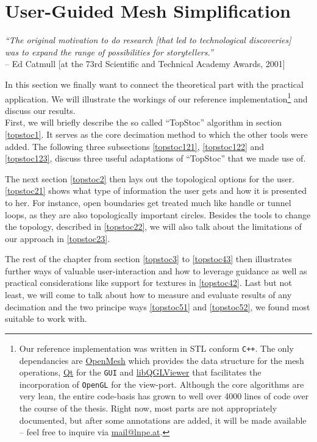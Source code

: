 \chapter{User-Guided Mesh Simplification}
\label{topstoc0}

\begin{flushright}
\textit{``The original motivation to do research [that led to technological discoveries]\\was to expand the range of possibilities for storytellers.''}\\
-- Ed Catmull {[}at the 73rd Scientific and Technical Academy Awards, 2001{]}
\end{flushright}

In this section we finally want to connect the theoretical part with the practical application.
We will illustrate the workings of our reference implementation\footnote{ Our reference implementation was written in STL conform \texttt{C++}. The only dependancies are \href{http://www.openmesh.org/}{OpenMesh} which provides the data structure for the mesh operations, \href{http://www.qtcentre.org/content/}{Qt} for the \texttt{GUI} and \href{http://www.libqglviewer.com/}{libQGLViewer} that facilitates the incorporation of \texttt{OpenGL} for the view-port. Although the core algorithms are very lean, the entire code-basis has grown to well over 4000 lines of code over the course of the thesis.
Right now, most parts are not appropriately documented, but after some annotations are added, it will be made available -- feel free to inquire via \href{mailto:mail@lnpe.at}{mail@lnpe.at}.} and discuss our results.\\
First, we will briefly describe the so called ``TopStoc'' algorithm in section \ref{topstoc1}.
It serves as the core decimation method to which the other tools were added.
The following three subsections \ref{topstoc121}, \ref{topstoc122} and \ref{topstoc123}, discuss three useful adaptations of ``TopStoc'' that we made use of.

The next section \ref{topstoc2} then lays out the topological options for the user.
\ref{topstoc21} shows what type of information the user gets and how it is presented to her.
For instance, open boundaries get treated much like handle or tunnel loops, as they are also topologically important circles.
Besides the tools to change the topology, described in \ref{topstoc22}, we will also talk about the limitations of our approach in \ref{topstoc23}.

The rest of the chapter from section \ref{topstoc3} to \ref{topstoc43} then illustrates further ways of valuable user-interaction and how to leverage guidance as well as practical considerations like support for textures in \ref{topstoc42}.
Last but not least, we will come to talk about how to measure and evaluate results of any decimation and the two principe ways \ref{topstoc51} and \ref{topstoc52}, we found most suitable to work with.


